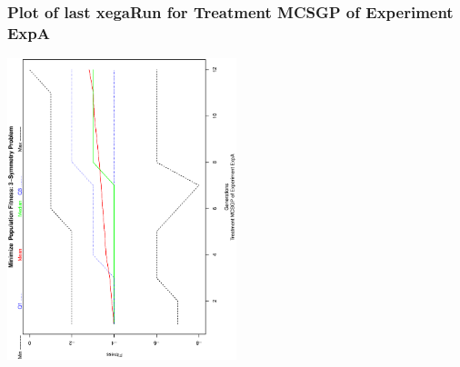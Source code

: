  \begin{frame}
 \frametitle{ Plot of last xegaRun for Treatment MCSGP of Experiment ExpA }
 \begin{center}
\includegraphics[width=0.5\textwidth, angle=-90]
{ExpAPlotPopStatsFigure001.eps}
 \end{center}
 \label{report/ExpAPlotPopStatsFigure001.eps}  
 \end{frame}

